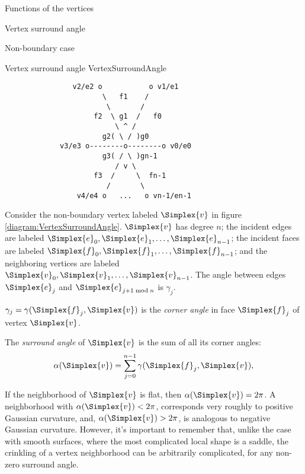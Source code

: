 \begin{plSection}{Functions of the vertices}
\label{sec:vertices}
\begin{plSection}{Vertex surround angle}
\label{sec:vertex_surround_angle}
\begin{plSection}{Non-boundary case}
\label{sec:non_boundary_vertex_surround_angle}

\begin{plDiagram}
{Vertex surround angle}
{VertexSurroundAngle}
\centering
\begin{verbatim}
                v2/e2 o           o v1/e1
                       \   f1    /
                        \       /
                     f2  \ g1  /   f0
                          \ ^ /
                       g2( \ / )g0
             v3/e3 o--------o--------o v0/e0
                       g3( / \ )gn-1
                          / v \
                     f3  /     \  fn-1
                        /       \
                 v4/e4 o   ...   o vn-1/en-1
\end{verbatim}
\end{plDiagram}

Consider the non-boundary vertex
labeled $\Simplex{v}$ in figure \ref{diagram:VertexSurroundAngle}.
$\Simplex{v}$ has degree $n$;
the incident edges are labeled 
$\Simplex{e}_0, \Simplex{e}_1, \ldots, \Simplex{e}_{n-1}$;
the incident faces are labeled 
$\Simplex{f}_0, \Simplex{f}_1, \ldots, \Simplex{f}_{n-1}$;
and the neighboring vertices are labeled 
$\Simplex{v}_0, \Simplex{v}_1, \ldots, \Simplex{v}_{n-1}$.
The angle between edges $\Simplex{e}_j$ and 
$\Simplex{e}_{j + 1 \bmod n}$ is $\gamma_j$.

$\gamma_j = \gamma(\Simplex{f}_j,\Simplex{v})$ is 
the {\em corner angle} in face $\Simplex{f}_j$
of vertex $\Simplex{v}$.

The {\em surround angle} of $\Simplex{v}$ is 
the sum of all its corner angles:
\begin{equation}
\alpha(\Simplex{v}) = 
\sum_{j=0}^{n-1} \gamma(\Simplex{f}_j,\Simplex{v}),
\end{equation}

If the neighborhood of $\Simplex{v}$ is flat, 
then $\alpha(\Simplex{v})=2\pi$.
A neighborhood with $\alpha(\Simplex{v}) < 2\pi$, 
corresponds very roughly
to positive Gaussian curvature,
and, $\alpha(\Simplex{v}) > 2\pi$,
is analogous to negative Gaussian curvature.
However, it's important to remember that, unlike the case
with smooth surfaces, where the most complicated local
shape is a saddle,
the crinkling of a vertex neighborhood can be arbitrarily complicated,
for any non-zero surround angle.


\end{plSection}
\end{plSection}
\end{plSection}

